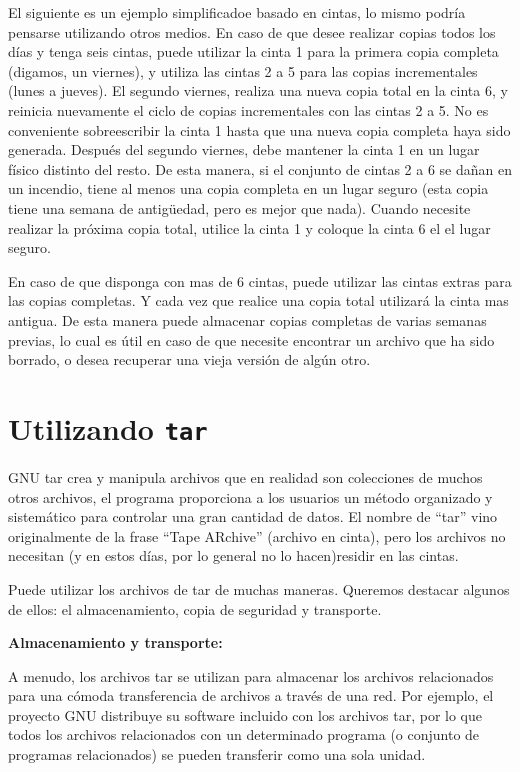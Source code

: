 \documentclass[12pt]{article}
\begin{document}
El siguiente es un ejemplo simplificadoe basado en cintas, lo mismo podría 
pensarse utilizando otros medios. 
En caso de que desee realizar copias todos los días y tenga seis cintas, 
puede utilizar la cinta 1 para la primera copia completa (digamos, un 
viernes), y utiliza las cintas 2 a 5 para las copias incrementales 
(lunes a jueves). El segundo viernes, realiza una nueva copia total en la 
cinta 6, y reinicia nuevamente el ciclo de copias incrementales con las 
cintas 2 a 5. No es conveniente sobreescribir la cinta 1 hasta que una 
nueva copia completa haya sido generada. Después del segundo viernes, debe
mantener la cinta 1 en un lugar físico distinto del resto. De esta manera, 
si el conjunto de cintas 2 a 6 se dañan en un incendio, tiene al menos una 
copia completa en un lugar seguro (esta copia tiene una semana de 
antigüedad, pero es mejor que nada).  Cuando necesite realizar la próxima 
copia total, utilice la cinta 1 y coloque la cinta 6 el el lugar seguro.

En caso de que disponga con mas de 6 cintas, puede utilizar las cintas 
extras para las copias completas. Y cada vez que realice una copia total 
utilizará la cinta mas antigua. De esta manera puede almacenar copias
completas de varias semanas previas, lo cual es útil en caso de que necesite
encontrar un archivo que ha sido borrado, o desea recuperar una vieja 
versión de algún otro.

\section*{Utilizando \texttt{tar}}
GNU tar crea y manipula archivos que en realidad son colecciones de muchos 
otros archivos, el programa proporciona a los usuarios un método organizado 
y sistemático para controlar una gran cantidad de datos. El nombre de 
``tar'' vino originalmente de la frase ``Tape ARchive'' (archivo en cinta),
pero los archivos no necesitan (y en estos días, por lo general no lo hacen)residir en las cintas.


Puede utilizar los archivos de tar de muchas maneras. Queremos destacar 
algunos de ellos: el almacenamiento, copia de seguridad y transporte.

{\bf Almacenamiento y transporte:}

A menudo, los archivos tar se utilizan para almacenar los archivos 
relacionados para una cómoda transferencia de archivos a través de una red.
Por ejemplo, el proyecto GNU distribuye su software incluido con los 
archivos tar, por lo que todos los archivos relacionados con un determinado 
programa (o conjunto de programas relacionados) se pueden transferir como 
una sola unidad.
\end{document}
